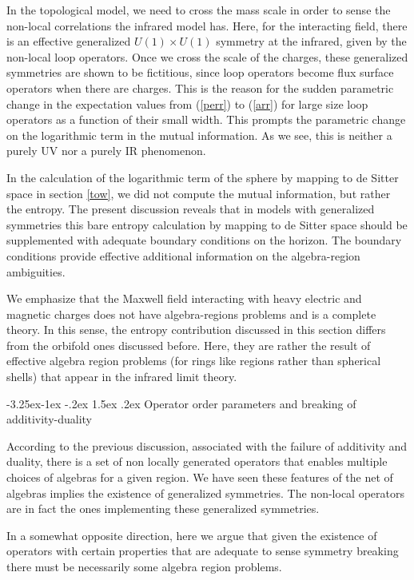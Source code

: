 \documentclass[11pt,a4paper]{article}
\makeatletter
\renewcommand\subsection{\@startsection{subsection}{2}{\z@}%
                                   {-3.25ex\@plus -1ex \@minus -.2ex}%
                                     {1.5ex \@plus .2ex}%
                                     {\normalfont\bfseries}}
\numberwithin{equation}{section}
\makeatother
\begin{document}
In the topological model, we need to cross the mass scale in order to sense the non-local correlations the infrared model has. Here, for the interacting field, there is an effective generalized $U(1)\times U(1)$ symmetry at the infrared, given by the non-local loop operators. Once we cross the scale of the charges, these generalized symmetries are shown to be fictitious, since loop operators become flux surface operators when there are charges. This is the reason for the sudden parametric change in the expectation values from (\ref{perr}) to (\ref{arr}) for large size loop operators as a function of their small width. This prompts the parametric change on the logarithmic term in the mutual information. As we see, this is neither a purely UV nor a purely IR phenomenon.     

In the calculation of the logarithmic term of the sphere by mapping to de Sitter space in section \ref{tow}, we did not compute the mutual information, but rather the entropy. The present discussion reveals that in models with generalized symmetries this bare entropy calculation by mapping to de Sitter space should be supplemented with adequate boundary conditions on the horizon.  The boundary conditions provide effective additional information on the algebra-region ambiguities.

We emphasize that the Maxwell field interacting with heavy electric and magnetic charges does not have algebra-regions problems and is a complete theory. In this sense, the entropy contribution discussed in this section differs from the orbifold ones discussed before. Here, they are rather the result of effective algebra region problems (for rings like regions rather than spherical shells) that appear in the infrared limit theory. 


\subsection{Operator order parameters and breaking of additivity-duality}

According to the previous discussion, associated with the failure of additivity and duality, there is a set of non locally generated operators that enables multiple choices of algebras for a given region. We have seen these features of the net of algebras implies the existence of generalized symmetries. The non-local operators are in fact the ones implementing these generalized symmetries.

In a somewhat opposite direction, here we argue that given the existence of operators with certain properties that are adequate to sense symmetry breaking there must be necessarily some algebra region problems. 
\end{document}
